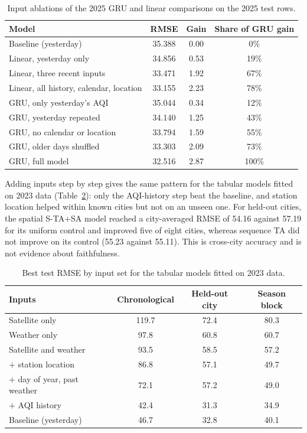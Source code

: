 \documentclass[pdflatex,sn-mathphys-num]{sn-jnl}
\begin{document}
\begin{table}[!htbp]
\centering
\small
\caption{Input ablations of the 2025 GRU and linear comparisons on the 2025 test rows.}\label{tab:ablation}
\begin{tabular}{lccc}
\toprule
\textbf{Model} & \textbf{RMSE} & \textbf{Gain} & \textbf{Share of GRU gain} \\
\midrule
Baseline (yesterday) & 35.388 & 0.00 & 0\% \\
Linear, yesterday only & 34.856 & 0.53 & 19\% \\
Linear, three recent inputs & 33.471 & 1.92 & 67\% \\
Linear, all history, calendar, location & 33.155 & 2.23 & 78\% \\
GRU, only yesterday's AQI & 35.044 & 0.34 & 12\% \\
GRU, yesterday repeated & 34.140 & 1.25 & 43\% \\
GRU, no calendar or location & 33.794 & 1.59 & 55\% \\
GRU, older days shuffled & 33.303 & 2.09 & 73\% \\
GRU, full model & 32.516 & 2.87 & 100\% \\
\bottomrule
\end{tabular}
\end{table}

Adding inputs step by step gives the same pattern for the tabular models fitted on 2023 data (Table~\ref{tab:ladder}): only the AQI-history step beat the baseline, and station location helped within known cities but not on an unseen one. For held-out cities, the spatial S-TA+SA model reached a city-averaged RMSE of 54.16 against 57.19 for its uniform control and improved five of eight cities, whereas sequence TA did not improve on its control (55.23 against 55.11). This is cross-city accuracy and is not evidence about faithfulness.

\begin{table}[!htbp]
\centering
\small
\caption{Best test RMSE by input set for the tabular models fitted on 2023 data.}\label{tab:ladder}
\begin{tabular}{lccc}
\toprule
\textbf{Inputs} & \textbf{Chronological} & \textbf{Held-out city} & \textbf{Season block} \\
\midrule
Satellite only & 119.7 & 72.4 & 80.3 \\
Weather only & 97.8 & 60.8 & 60.7 \\
Satellite and weather & 93.5 & 58.5 & 57.2 \\
$+$ station location & 86.8 & 57.1 & 49.7 \\
$+$ day of year, past weather & 72.1 & 57.2 & 49.0 \\
$+$ AQI history & 42.4 & 31.3 & 34.9 \\
Baseline (yesterday) & 46.7 & 32.8 & 40.1 \\
\bottomrule
\end{tabular}
\end{table}
\end{document}
